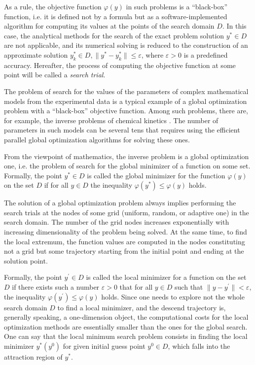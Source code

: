 \documentclass[runningheads]{llncs}
\begin{document}
As a rule, the objective function $\varphi(y)$ in such problems is a ``black-box'' function, i.e. it is defined not by a formula but as a software-implemented algorithm for computing its values at the points of the search domain $D$. In this case, the analytical methods for the search of the exact problem solution $y^{*}  \in D$ are not applicable, and its numerical solving is reduced to the construction of an approximate solution $y_k^* \in D, \|y^{*} - y_k^*\| \leq \varepsilon$, where $\varepsilon > 0$ is a predefined accuracy. Hereafter, the process of computing the objective function at some point will be called a \textit{search trial}.

The problem of search for the values of the parameters of complex mathematical models from the experimental data is a typical example of a global optimization problem with a ``black-box'' objective function. Among such problems, there are, for example, the inverse problems of chemical kinetics \cite{Akhmadullina2017,Nurislamova2016}. The number of parameters in such models can be several tens that requires using the efficient parallel global optimization algorithms for solving these ones.

From the viewpoint of mathematics, the inverse problem is a global optimization one, i.e. the problem of search for the global minimizer of a function on some set. Formally, the point $y^{*} \in D$ is called the global minimizer for the function $\varphi(y)$ on the set $D$ if for all $y \in D$ the inequality $\varphi(y^{*}) \leq \varphi(y)$ holds.

The solution of a global optimization problem always implies performing the search trials at the nodes of some grid (uniform, random, or adaptive one) in the search domain. The number of the grid nodes increases exponentially with increasing dimensionality of the problem being solved. At the same time, to find the local extremum, the function values are computed in the nodes constituting not a grid but some trajectory starting from the initial  point and ending at the solution point. 

Formally, the point $y^{\prime} \in D$ is called the local minimizer for a function on the set $D$ if there exists such a number $\varepsilon > 0$ that for all $y \in D$ such that $\|y - y^{\prime}\| < \varepsilon$, the inequality $\varphi(y^{\prime}) \leq \varphi(y)$ holds. Since one needs to explore not the whole search domain $D$ to find a local minimizer, and the descend trajectory is, generally speaking, a one-dimension object, the computational costs for the local optimization methods are essentially smaller than the ones for the global search.
One can say that the local minimum search problem consists in finding the local minimizer $y^{*}(y^{0})$ for given initial guess point $y^{0} \in D$, which falls into the attraction region of $y^{*}$.
\end{document}

